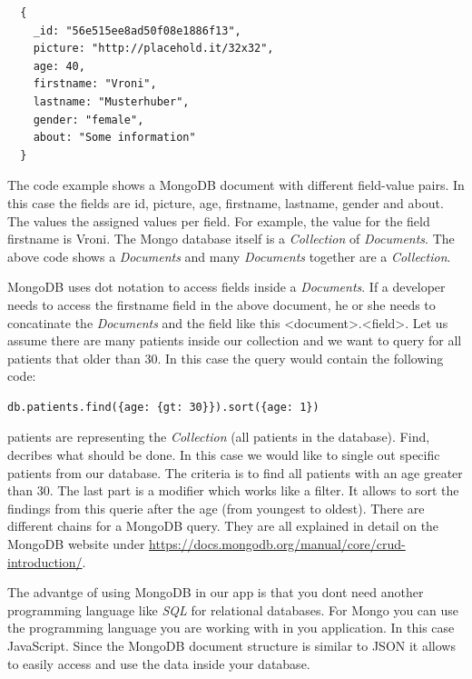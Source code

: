 \begin{verbatim}
  {
    _id: "56e515ee8ad50f08e1886f13",
    picture: "http://placehold.it/32x32",
    age: 40,
    firstname: "Vroni",
    lastname: "Musterhuber",
    gender: "female",
    about: "Some information"
  }
\end{verbatim}

The code example shows a MongoDB document with different field-value pairs. In this case the fields are id, picture, age, firstname, lastname, gender and
about. The values the assigned values per field. For example, the value for the field firstname is Vroni. The Mongo database itself is a \textit{Collection}
of \textit{Documents}. The above code shows a \textit{Documents} and many \textit{Documents} together are a \textit{Collection}.

MongoDB uses dot notation to access fields inside a \textit{Documents}. If a developer needs to access the firstname field in the above document, he or she
needs to concatinate the \textit{Documents} and the field like this <document>.<field>. Let us assume there are many patients inside our collection and we
want to query for all patients that older than 30. In this case the query would contain the following code:

\begin{verbatim}
db.patients.find({age: {gt: 30}}).sort({age: 1})
\end{verbatim}

patients are representing the \textit{Collection} (all patients in the database). Find, decribes what should be done. In this
case we would like to single out specific patients from our database. The criteria is to find all patients with an age greater than 30. The last part is
a modifier which works like a filter. It allows to sort the findings from this querie after the age (from youngest to oldest). There are different
chains for a MongoDB query. They are all explained in detail on the MongoDB website under \url{https://docs.mongodb.org/manual/core/crud-introduction/}.

The advantge of using MongoDB in our app is that you dont need another programming language like \textit{SQL} for relational databases.
For Mongo you can use the programming language you are working with in you application. In this case JavaScript. Since the MongoDB document structure is
similar to JSON it allows to easily access and use the data inside your database. \cite{chodorow2013mongodb}

